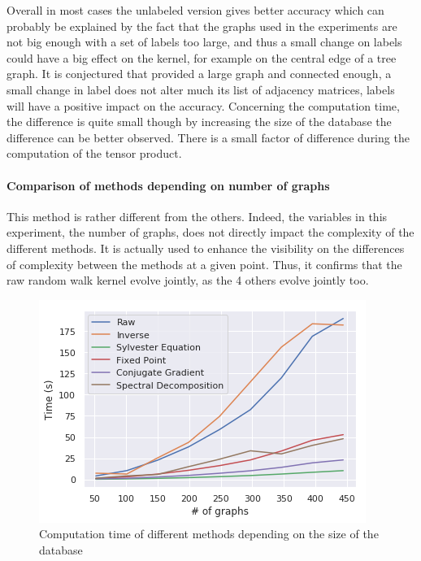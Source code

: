 \documentclass{article}
\theoremstyle{definition}
\begin{document}
Overall in most cases the unlabeled version gives better accuracy which can probably be explained by the fact that the graphs used in the experiments are not big enough with a set of labels too large, and thus a small change on labels could have a big effect on the kernel, for example on the central edge of a tree graph. It is conjectured that provided a large graph and connected enough, a small change in label does not alter much its list of adjacency matrices, labels will have a positive impact on the accuracy. Concerning the computation time, the difference is quite small though by increasing the size of the database the difference can be better observed. There is a small factor of difference during the computation of the tensor product.
\paragraph{Comparison of methods depending on number of graphs}
This method is rather different from the others. Indeed, the variables in this experiment, the number of graphs, does not directly impact the complexity of the different methods. It is actually used to enhance the visibility on the differences of complexity between the methods at a given point. Thus, it confirms that the raw random walk kernel evolve jointly, as the 4 others evolve jointly too. 
\begin{figure}[!htb]
	\centering
		\includegraphics[width=.5\linewidth]{data/nb_graph/time.png}\par
	\caption{Computation time of different methods depending on the size of the database}
\end{figure}
\end{document}
